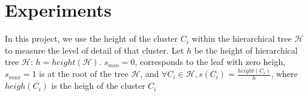 \section{Experiments}
\label{sec:experiments}
In this project, we use the height of the cluster $C_i$ within the hierarchical tree $\mathcal{H}$ to measure the level of detail of that cluster. Let $h$ be the height of hierarchical tree $\mathcal{H}$: $h = height(\mathcal{H})$. $s_{min} = 0$, corresponds to the leaf with zero heigh, $s_{max} = 1$ is at the root of the tree $\mathcal{H}$, and $\forall C_i \in \mathcal{H}, s(C_i) = \frac{height(C_i)}{h}$, where $heigh(C_i)$ is the heigh of the cluster $C_i$~\cite{yang2003interactive}


 


